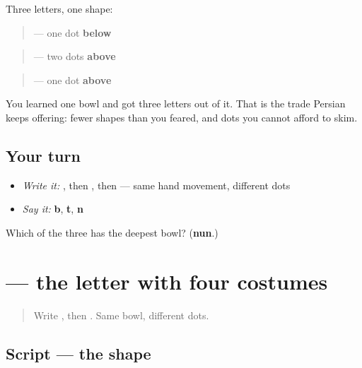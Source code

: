 \begin{grammarlens}[title={What you've built}]
Three letters, one shape:

\begin{quote}
 — one dot \textbf{below}
\end{quote}

\begin{quote}
 — two dots \textbf{above}
\end{quote}

\begin{quote}
 — one dot \textbf{above}
\end{quote}

You learned one bowl and got three letters out of it. That is the trade Persian keeps offering: fewer shapes than you feared, and dots you cannot afford to skim.
\end{grammarlens}

\subsection*{Your turn}
\begin{itemize}
\raggedright
  \item \emph{Write it:} , then , then  — same hand movement, different dots
  \item \emph{Say it:} \textbf{b}, \textbf{t}, \textbf{n}
\end{itemize}

\begin{tcolorbox}[breakable,colback=teal!4,colframe=teal!35!black,title={Before you move on}]
Which of the three has the deepest bowl? (\textbf{nun}.)
\end{tcolorbox}
\section[\texorpdfstring{\fa{ه} (he)}{ه (he)}]{ — the letter with four costumes}

\label{lesson:FA-W15-he}



\begin{quote}
Write , then . Same bowl, different dots.
\end{quote}

\subsection*{Script — the shape}

